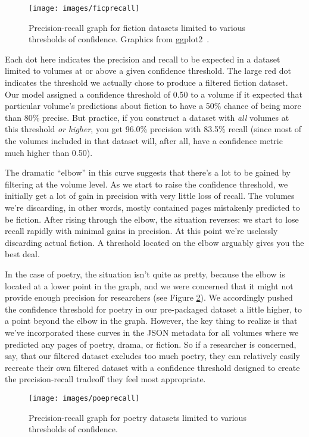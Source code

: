 \documentclass[paper=a4, fontsize=12pt]{scrartcl}
\numberwithin{equation}{section}		%
\numberwithin{figure}{section}			%
\numberwithin{table}{section}				%
\begin{document}
\begin{figure}[!h]
\centering
\texttt{[image: images/ficprecall]}
\caption{Precision-recall graph for fiction datasets limited to various thresholds of confidence. Graphics from ggplot2~\cite{ggplot}.}
\label{ficprecall}
\end{figure}

Each dot here indicates the precision and recall to be expected in a dataset limited to volumes at or above a given confidence threshold. The large red dot indicates the threshold we actually chose to produce a filtered fiction dataset. Our model assigned a confidence threshold of 0.50 to a volume if it expected that particular volume's predictions about fiction to have a 50\% chance of being more than 80\% precise. But practice, if you construct a dataset with \textit{all} volumes at this threshold \textit{or higher}, you get 96.0\% precision with 83.5\% recall (since most of the volumes included in that dataset will, after all, have a confidence metric much higher than 0.50).

The dramatic ``elbow'' in this curve suggests that there's a lot to be gained by filtering at the volume level. As we start to raise the confidence threshold, we initially get a lot of gain in precision with very little loss of recall. The volumes we're discarding, in other words, mostly contained pages mistakenly predicted to be fiction. After rising through the elbow, the situation reverses: we start to lose recall rapidly with minimal gains in precision. At this point we're uselessly discarding actual fiction. A threshold located on the elbow arguably gives you the best deal.

In the case of poetry, the situation isn't quite as pretty, because the elbow is located at a lower point in the graph, and we were concerned that it might not provide enough precision for researchers (see Figure \ref{poeprecall}). We accordingly pushed the confidence threshold for poetry in our pre-packaged dataset a little higher, to a point beyond the elbow in the graph. However, the key thing to realize is that we've incorporated these curves in the JSON metadata for all volumes where we predicted any pages of poetry, drama, or fiction. So if a researcher is concerned, say, that our filtered dataset excludes too much poetry, they can relatively easily recreate their own filtered dataset with a confidence threshold designed to create the precision-recall tradeoff they feel most appropriate.

\begin{figure}[!h]
\centering
\texttt{[image: images/poeprecall]}
\caption{Precision-recall graph for poetry datasets limited to various thresholds of confidence.}
\label{poeprecall}
\end{figure}
\end{document}
